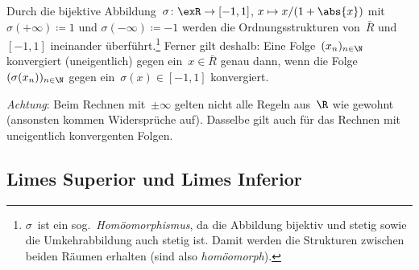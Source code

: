 \documentclass[a4paper]{article}
\begin{document}
\begin{remark}
    Durch die bijektive Abbildung~$\sigma\colon \exR \to [-1, 1]$, $x \mapsto x / (1+\abs{x})$ mit $\sigma(+\infty) \coloneqq 1$ und $\sigma(-\infty) \coloneqq -1$ werden die Ordnungsstrukturen von~$\bar{R}$ und~$[-1, 1]$ ineinander überführt.\footnote{$\sigma$~ist ein sog.\ \emph{Homöomorphismus}, da die Abbildung bijektiv und stetig sowie die Umkehrabbildung auch stetig ist. Damit werden die Strukturen zwischen beiden Räumen erhalten (sind also \emph{homöomorph}).} Ferner gilt deshalb: Eine Folge~$(x_n)_{n\in\N}$ konvergiert (uneigentlich) gegen ein~$x \in \bar{R}$ genau dann, wenn die Folge~$(\sigma(x_n))_{n\in\N}$ gegen ein~$\sigma(x) \in [-1, 1]$ konvergiert.
    \begin{center}
    \end{center}
\end{remark}

\emph{Achtung}: Beim Rechnen mit~$\pm\infty$ gelten nicht alle Regeln aus~$\R$ wie gewohnt (ansonsten kommen Widersprüche auf). Dasselbe gilt auch für das Rechnen mit uneigentlich konvergenten Folgen.

\subsection{Limes Superior und Limes Inferior}
\end{document}
